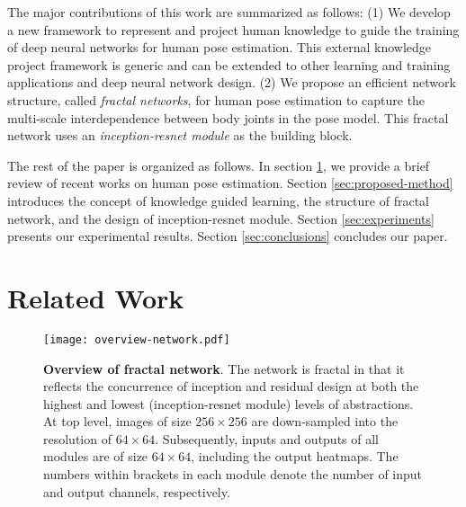 \documentclass[journal ]{IEEEtran}
\begin{document}
The major contributions of this work are summarized as follows:
(1) We develop a new framework to represent and project human knowledge to guide the training of deep neural networks for human pose estimation. This external knowledge project framework is generic and can be extended to other learning and training applications and deep neural network design. 
(2) We propose an efficient network structure, called {\it fractal networks}, for human pose estimation to capture the multi-scale interdependence between body joints in the pose model. This fractal network uses an \textit{inception-resnet module} as the building block.

The rest of the paper is organized as follows.
In section \ref{sec:related-work}, we provide a brief review of recent works on human pose estimation. Section \ref{sec:proposed-method} introduces the concept of knowledge guided learning, the structure of fractal network, and the design of inception-resnet module. Section \ref{sec:experiments} presents our experimental results. Section \ref{sec:conclusions} concludes our paper.

















\section{Related Work}
\label{sec:related-work}

\begin{figure*}
	\begin{center}
		\texttt{[image: overview-network.pdf]}
	\end{center}
	\caption{\textbf{Overview of fractal network}. The network is fractal in that it reflects the concurrence of inception and residual design at both the highest and lowest (inception-resnet module) levels of abstractions. At top level, images of size $256 \times 256$ are down-sampled into the resolution of $64 \times 64$. Subsequently, inputs and outputs of all modules are of size $64 \times 64$, including the output heatmaps. The numbers within brackets in each module denote the number of input and output channels, respectively.}
	\label{fig:overview}
\end{figure*}
\end{document}
